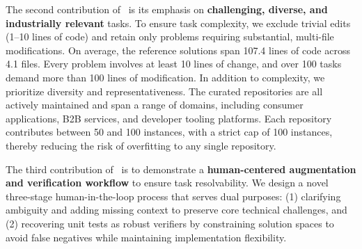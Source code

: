 
The second contribution of \benchmarkname~is its emphasis on \textbf{challenging, diverse, and industrially relevant} tasks. To ensure task complexity, we exclude trivial edits (1–10 lines of code) and retain only problems requiring substantial, multi-file modifications. On average, the reference solutions span 107.4 lines of code across 4.1 files. Every problem involves at least 10 lines of change, and over 100 tasks demand more than 100 lines of modification. In addition to complexity, we prioritize diversity and representativeness. The curated repositories are all actively maintained and span a range of domains, including consumer applications, B2B services, and developer tooling platforms. Each repository contributes between 50 and 100 instances, with a strict cap of 100 instances, thereby reducing the risk of overfitting to any single repository. 


The third contribution of \benchmarkname~is to demonstrate a \textbf{human-centered augmentation and verification workflow} to ensure task resolvability. We design a novel three-stage human-in-the-loop process that serves dual purposes: (1) clarifying ambiguity and adding missing context to preserve core technical challenges, and (2) recovering unit tests as robust verifiers by constraining solution spaces to avoid false negatives while maintaining implementation flexibility.

